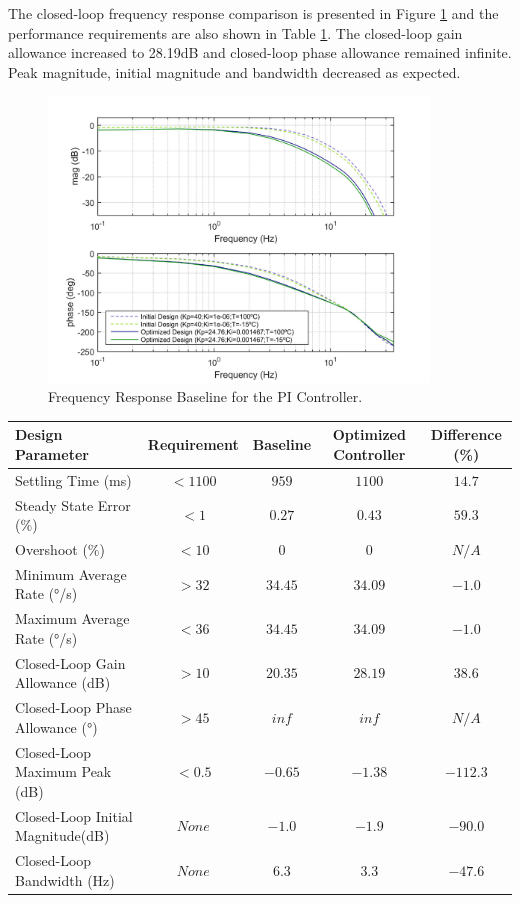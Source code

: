 The closed-loop frequency response comparison is presented in Figure \ref{fig:5_2_2_PI_FreqResp} and the performance requirements are also shown in Table \ref{table:5_2_2_PI_PerfTable}. The closed-loop gain allowance increased to 28.19dB  and closed-loop phase allowance remained infinite. Peak magnitude, initial magnitude and bandwidth decreased as expected.

\begin{figure}[H]
	\centering
	\centerline{\includegraphics[width=0.9\textwidth]{Figuras/5.OptimizationResults/5-2-2-PI-FrequencyResponseComparison.jpg}}
	\caption{Frequency Response Baseline for the PI Controller.}
	\label{fig:5_2_2_PI_FreqResp}
\end{figure}

\begin{table}[H]
	\label{table:5_2_2_PI_PerfTable}
	\centering
	\resizebox{14cm}{!} {
		\begin{tabular}{|l|c|c|c|c|}
			\hline
			Design Parameter & Requirement & Baseline & Optimized Controller & Difference (\%) \\ \hline
			Settling Time (ms) & $< 1100$ & $959$ & $1100$ & $14.7$ \\ \hline
			Steady State Error ($\%$) & $< 1$ & $0.27$ & $0.43$ & $59.3$ \\ \hline
			Overshoot ($\%$) & $< 10$ & $0$ & $0$ & $N/A$ \\ \hline
			Minimum Average Rate ($°$/s) & $> 32$ & $34.45$ & $34.09$ & $-1.0$ \\ \hline
			Maximum Average Rate ($°$/s) & $< 36$ & $34.45$ & $34.09$ & $-1.0$ \\ \hline
			Closed-Loop Gain Allowance (dB) & $> 10$ & $20.35$ & $28.19$ & $38.6$ \\ \hline
			Closed-Loop Phase Allowance ($°$) & $> 45$ & $inf$ & $inf$ & $N/A$ \\ \hline
			Closed-Loop Maximum Peak (dB) & $< 0.5$ & $-0.65$ & $-1.38$ & $-112.3$ \\ \hline
			Closed-Loop Initial Magnitude(dB) & $None$ & $-1.0$ & $-1.9$ & $-90.0$ \\ \hline
			Closed-Loop Bandwidth (Hz) & $None$ & $6.3$ & $3.3$ & $-47.6$ \\ \hline
	\end{tabular}}
\end{table}

